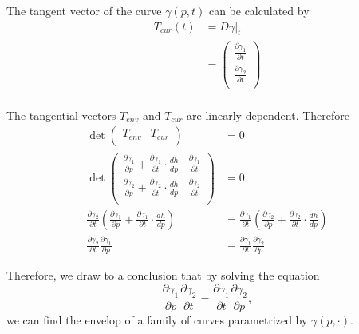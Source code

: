 \documentclass[a4paper]{article}
\begin{document}
The tangent vector of the curve $\gamma(p,t)$ can be calculated by
\begin{align*}
T_{cur}(t) &= D\gamma\vert_t\\
&=
\begin{pmatrix}
\frac{\partial \gamma_1}{\partial t}\\
\frac{\partial \gamma_2}{\partial t}\\
\end{pmatrix}\\
\end{align*}

The tangential vectors $T_{env}$ and $T_{cur}$ are linearly dependent. Therefore
\begin{align*}
\det
\begin{pmatrix}
T_{env} & T_{cur}\\
\end{pmatrix}
&= 0\\
\det
\begin{pmatrix}
\frac{\partial \gamma_1}{\partial p} + \frac{\partial \gamma_1}{\partial t}\cdot \frac{dh}{dp} & \frac{\partial \gamma_1}{\partial t}\\
\frac{\partial \gamma_2}{\partial p} + \frac{\partial \gamma_2}{\partial t}\cdot \frac{dh}{dp} & \frac{\partial \gamma_2}{\partial t}\\
\end{pmatrix}
&= 0\\
\frac{\partial \gamma_2}{\partial t}(\frac{\partial \gamma_1}{\partial p} + \frac{\partial \gamma_1}{\partial t}\cdot \frac{dh}{dp}) &= \frac{\partial \gamma_1}{\partial t}(\frac{\partial \gamma_2}{\partial p} + \frac{\partial \gamma_2}{\partial t}\cdot \frac{dh}{dp})\\
\frac{\partial \gamma_2}{\partial t}\frac{\partial \gamma_1}{\partial p} &= \frac{\partial \gamma_1}{\partial t}\frac{\partial \gamma_2}{\partial p}
\end{align*}

Therefore, we draw to a conclusion that by solving the equation 
$$\frac{\partial \gamma_1}{\partial p}\frac{\partial \gamma_2}{\partial t} = \frac{\partial \gamma_1}{\partial t}\frac{\partial \gamma_2}{\partial p},$$
we can find the envelop of a family of curves parametrized by $\gamma(p,\cdot)$.
\end{document}
